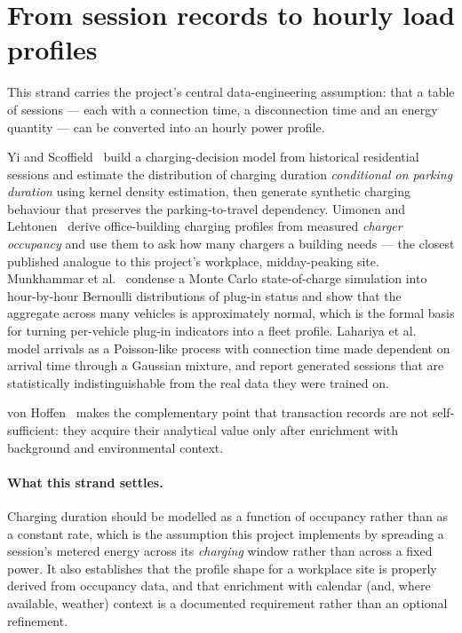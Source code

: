 \documentclass[11pt,a4paper]{article}
\begin{document}
\section{From session records to hourly load profiles}\label{sec:profiles}

This strand carries the project's central data-engineering assumption: that a table of sessions ---
each with a connection time, a disconnection time and an energy quantity --- can be converted into an
hourly power profile.

Yi and Scoffield~\cite{Yi2018ResidentialLoadProfileGeneration} build a charging-decision model from
historical residential sessions and estimate the distribution of charging duration \emph{conditional
on parking duration} using kernel density estimation, then generate synthetic charging behaviour that
preserves the parking-to-travel dependency. Uimonen and Lehtonen~\cite{Uimonen2020OfficeBuildingOccupancy}
derive office-building charging profiles from measured \emph{charger occupancy} and use them to ask how
many chargers a building needs --- the closest published analogue to this project's workplace,
midday-peaking site. Munkhammar et al.~\cite{Munkhammar2014BernoulliPEVCharging} condense a Monte Carlo
state-of-charge simulation into hour-by-hour Bernoulli distributions of plug-in status and show that
the aggregate across many vehicles is approximately normal, which is the formal basis for turning
per-vehicle plug-in indicators into a fleet profile. Lahariya et al.~\cite{Lahariya2020SyntheticDataGenerator}
model arrivals as a Poisson-like process with connection time made dependent on arrival time through a
Gaussian mixture, and report generated sessions that are statistically indistinguishable from the real
data they were trained on.

von Hoffen~\cite{vonHoffen2016ChargingTransactionAnalytics} makes the complementary point that
transaction records are not self-sufficient: they acquire their analytical value only after enrichment
with background and environmental context.

\paragraph{What this strand settles.} Charging duration should be modelled as a function of occupancy
rather than as a constant rate, which is the assumption this project implements by spreading a
session's metered energy across its \emph{charging} window rather than across a fixed power. It also
establishes that the profile shape for a workplace site is properly derived from occupancy data, and
that enrichment with calendar (and, where available, weather) context is a documented requirement
rather than an optional refinement.
\end{document}
